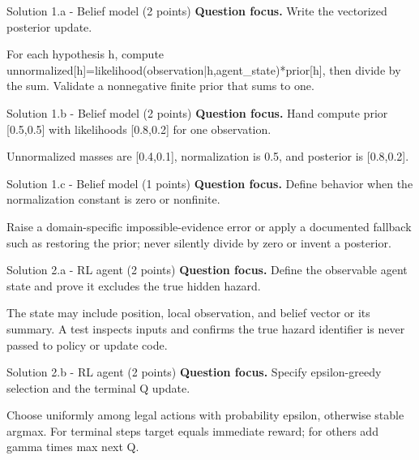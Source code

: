\documentclass[aspectratio=169,11pt]{beamer}
\begin{document}
\begin{frame}{Solution 1.a - Belief model (2 points)}
\small
\textbf{Question focus.} Write the vectorized posterior update.

\vspace{0.25cm}
\answerlabel For each hypothesis h, compute unnormalized[h]=likelihood(observation|h,agent\_state)*prior[h], then divide by the sum. Validate a nonnegative finite prior that sums to one.
\end{frame}

\begin{frame}{Solution 1.b - Belief model (2 points)}
\small
\textbf{Question focus.} Hand compute prior [0.5,0.5] with likelihoods [0.8,0.2] for one observation.

\vspace{0.25cm}
\answerlabel Unnormalized masses are [0.4,0.1], normalization is 0.5, and posterior is [0.8,0.2].
\end{frame}

\begin{frame}{Solution 1.c - Belief model (1 points)}
\small
\textbf{Question focus.} Define behavior when the normalization constant is zero or nonfinite.

\vspace{0.25cm}
\answerlabel Raise a domain-specific impossible-evidence error or apply a documented fallback such as restoring the prior; never silently divide by zero or invent a posterior.
\end{frame}

\begin{frame}{Solution 2.a - RL agent (2 points)}
\small
\textbf{Question focus.} Define the observable agent state and prove it excludes the true hidden hazard.

\vspace{0.25cm}
\answerlabel The state may include position, local observation, and belief vector or its summary. A test inspects inputs and confirms the true hazard identifier is never passed to policy or update code.
\end{frame}

\begin{frame}{Solution 2.b - RL agent (2 points)}
\small
\textbf{Question focus.} Specify epsilon-greedy selection and the terminal Q update.

\vspace{0.25cm}
\answerlabel Choose uniformly among legal actions with probability epsilon, otherwise stable argmax. For terminal steps target equals immediate reward; for others add gamma times max next Q.
\end{frame}
\end{document}
